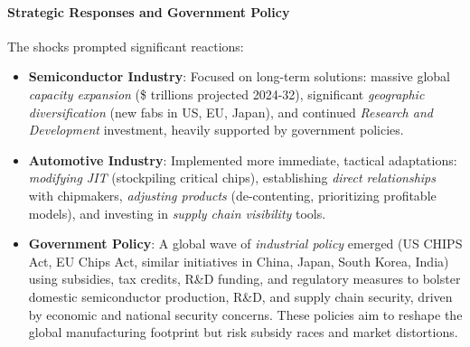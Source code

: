 \paragraph{Strategic Responses and Government Policy}
The shocks prompted significant reactions:
\begin{itemize}
    \item \textbf{Semiconductor Industry}: Focused on long-term solutions: massive global \textit{capacity expansion} (\$ trillions projected 2024-32), significant \textit{geographic diversification} (new fabs in US, EU, Japan), and continued \textit{Research and Development} investment, heavily supported by government policies.
    \item \textbf{Automotive Industry}: Implemented more immediate, tactical adaptations: \textit{modifying JIT} (stockpiling critical chips), establishing \textit{direct relationships} with chipmakers, \textit{adjusting products} (de-contenting, prioritizing profitable models), and investing in \textit{supply chain visibility} tools.
    \item \textbf{Government Policy}: A global wave of \textit{industrial policy} emerged (US CHIPS Act, EU Chips Act, similar initiatives in China, Japan, South Korea, India) using subsidies, tax credits, R\&D funding, and regulatory measures to bolster domestic semiconductor production, R\&D, and supply chain security, driven by economic and national security concerns. These policies aim to reshape the global manufacturing footprint but risk subsidy races and market distortions.
\end{itemize}

